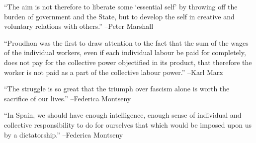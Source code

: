 \documentclass{article}%
\begin{document}
\linebreak%
\vspace{1mm}%
\begin{minipage}{\textwidth}%
\flushleft%
“The aim is not therefore to liberate some ‘essential self’ by throwing off the burden of government and the State, but to develop the self in creative and voluntary relations with others.”%
\linebreak%
\vspace{1mm}%
–Peter Marshall%
\linebreak%
\vspace{1mm}%
\end{minipage}%
\linebreak%
\vspace{1mm}%
\begin{minipage}{\textwidth}%
\flushleft%
“Proudhon was the first to draw attention to the fact that the sum of the wages of the individual workers, even if each individual labour be paid for completely, does not pay for the collective power objectified in its product, that therefore the worker is not paid as a part of the collective labour power.”%
\linebreak%
\vspace{1mm}%
–Karl Marx%
\linebreak%
\vspace{1mm}%
\end{minipage}%
\linebreak%
\vspace{1mm}%
\begin{minipage}{\textwidth}%
\flushleft%
“The struggle is so great that the triumph over fascism alone is worth the sacrifice of our lives.”%
\linebreak%
\vspace{1mm}%
–Federica Montseny%
\linebreak%
\vspace{1mm}%
\end{minipage}%
\linebreak%
\vspace{1mm}%
\begin{minipage}{\textwidth}%
\flushleft%
“In Spain, we should have enough intelligence, enough sense of individual and collective responsibility to do for ourselves that which would be imposed upon us by a dictatorship.”%
\linebreak%
\vspace{1mm}%
–Federica Montseny%
\linebreak%
\vspace{1mm}%
\end{minipage}%
\end{document}
